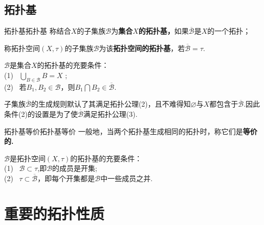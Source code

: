 \documentclass{ctexart}
\begin{document}
\subsection{拓扑基}
\begin{定义}{拓扑基}{拓扑基}
	称结合$X$的子集族$\mathscr{B}$为\textbf{集合}$X$\textbf{的}\textbf{拓扑基，}如果$\overline{ \mathscr{B}}$是$X$的一个拓扑；
	
	称拓扑空间$(X,\tau)$的子集族$\mathscr{B}$为该\textbf{拓扑空间的拓扑基}，若$\overline{\mathscr{B}}=\tau.$
\end{定义}
\begin{命题}{}{}
	$\mathscr{B}$是集合$X$的拓扑基的充要条件：\\
	(1) \, $\displaystyle\bigcup_{B\in\mathscr{B}}B=X\text{ ;}$\\
	(2) \, 若$ B_1,B_2\in\mathscr{B}$，则$B_1\bigcap B_2{\in}\overline{\mathscr{B}}$.
\end{命题}
\begin{提示}
	子集族$\overline{ \mathscr{B} }$的生成规则默认了其满足拓扑公理(2)，且不难得知$\varnothing$与$X$都包含于$\overline{ \mathscr{B} }$.因此条件(2)的设置是为了使$\overline{ \mathscr{B} }$满足拓扑公理(3).
\end{提示}
\begin{定义}{拓扑基等价}{拓扑基等价}
	一般地，当两个拓扑基生成相同的拓扑时，称它们是\textbf{等价的.}
\end{定义}
\begin{命题}{}{}
	$\mathscr{B}$是拓扑空间$(X,\tau)$的拓扑基的充要条件：\\
	(1) \, $\mathscr{B}\subset\tau $,即$\mathscr{B}$的成员是开集;\\
	(2) \, $\tau\subset\overline{\mathscr{B}}$，即每个开集都是$\mathscr{B}$中一些成员之并.
\end{命题}



\section{重要的拓扑性质}
\end{document}
